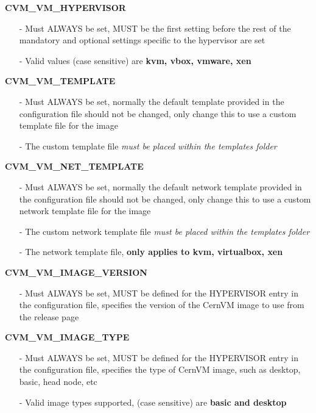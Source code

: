 \begin{description}
\item {\bf CVM\_VM\_HYPERVISOR}
		\begin{itemize}
		\item[-]	Must ALWAYS be set, MUST be the first setting before the rest of the mandatory
	  			and optional settings specific to the hypervisor are set
	  	\item[-]	Valid values (case sensitive) are {\bf kvm, vbox, vmware, xen}
		\end{itemize}

\item {\bf CVM\_VM\_TEMPLATE}
		\begin{itemize}
		\item[-]	Must ALWAYS be set, normally the default template provided in the configuration file
				should not be changed, only change this to use a custom template file for the \cernvm 
				image
		\item[-]	The custom template file \emph{must be placed within the templates folder}
		\end{itemize}

\item {\bf CVM\_VM\_NET\_TEMPLATE}
		\begin{itemize}
		\item[-]	Must ALWAYS be set, normally the default network template provided in the configuration file
				should not be changed, only change this to use a custom network template file for the \cernvm 
				image
		\item[-]	The custom network template file \emph{must be placed within the templates folder}
		\item[-] 	The network template file, {\bf only applies to kvm, virtualbox, xen}
		\end{itemize}

\item {\bf CVM\_VM\_IMAGE\_VERSION}
		\begin{itemize}
		\item[-]	Must ALWAYS be set,  MUST be defined for the HYPERVISOR entry in the configuration
				file, specifies the version of the CernVM image to use from the release page
		\end{itemize}
	
\item {\bf CVM\_VM\_IMAGE\_TYPE}
		\begin{itemize}
		\item[-]	Must ALWAYS be set,  MUST be defined for the HYPERVISOR entry in the configuration
				file, specifies the type of CernVM image, such as desktop, basic, head node, etc
		\item[-]	Valid image types supported, (case sensitive) are {\bf basic and desktop}
		\end{itemize}
		

\end{description}
